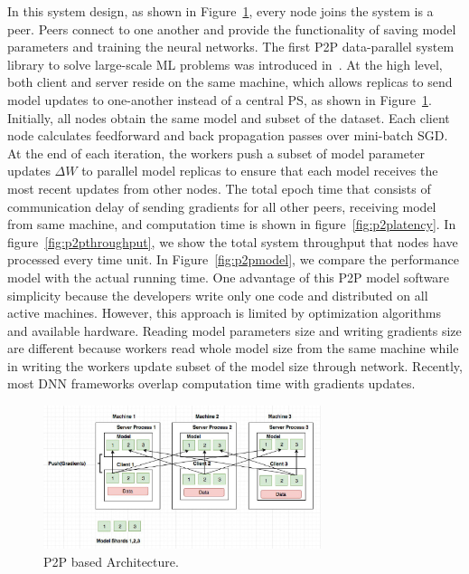 \documentclass[conference]{IEEEtran}
\begin{document}
In this system design, as shown in Figure~\ref{fig:p2p}, every node joins the system is a peer. Peers connect to one another and provide the functionality of saving model parameters and training the neural networks. The first P2P data-parallel system library to solve large-scale ML problems was introduced in~\cite{li2015malt}. At the high level, both client and server reside on the same machine, which allows replicas to send model updates to one-another instead of a central PS, as shown in Figure~\ref{fig:p2p}. Initially, all nodes obtain the same model and subset of the dataset. Each client node calculates feedforward and back propagation passes over mini-batch SGD. At the end of each iteration, the workers push a subset of model parameter updates $\Delta W$ to parallel model replicas to ensure that each model receives the most recent updates from other nodes. The total epoch time that consists of communication delay of sending gradients for all other peers, receiving model from same machine, and computation time is shown in figure~\ref{fig:p2platency}. In figure~\ref{fig:p2pthroughput}, we show the total system throughput that nodes have processed every time unit. In Figure~\ref{fig:p2pmodel}, we compare the performance model with the actual running time. One advantage of this P2P model software simplicity because the developers write only one code and distributed on all active machines. However, this approach is limited by optimization algorithms and available hardware.
Reading model parameters size and writing gradients size are different because workers read whole model size from the same machine while in writing the workers update subset of the model size through network. Recently, most DNN frameworks overlap computation time with gradients updates.

\begin{figure}[htb]
  \includegraphics[width=3.2in]{Fig/p2p.jpg}
  \caption{P2P based Architecture.}
  \label{fig:p2p}
\end{figure}
\end{document}
